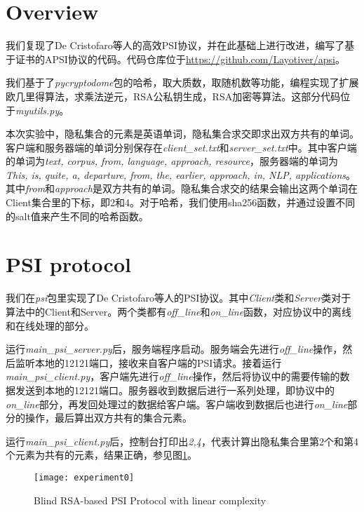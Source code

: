 \section{Overview}
我们复现了De Cristofaro等人的高效PSI协议，并在此基础上进行改进，编写了基于证书的APSI协议的代码。代码仓库位于\href{https://github.com/Layotiver/apsi}
{https://github.com/Layotiver/apsi}。

我们基于了\textit{pycryptodome}包的哈希，取大质数，取随机数等功能，编程实现了扩展欧几里得算法，求乘法逆元，RSA公私钥生成，RSA加密等算法。这部分代码位于\textit{myutils.py}。

本次实验中，隐私集合的元素是英语单词，隐私集合求交即求出双方共有的单词。客户端和服务器端的单词分别保存在\textit{client\_set.txt}和\textit{server\_set.txt}中。其中客户端的单词为\textit{text, corpus, from, language, approach, resource}，服务器端的单词为\textit{This, is, quite, a, departure, from, the, earlier, approach, in, NLP, applications}。其中\textit{from}和\textit{approach}是双方共有的单词。隐私集合求交的结果会输出这两个单词在Client集合里的下标，即2和4。对于哈希，我们使用sha256函数，并通过设置不同的salt值来产生不同的哈希函数。

\section{PSI protocol}
我们在\textit{psi}包里实现了De Cristofaro等人的PSI协议。其中\textit{Client}类和\textit{Server}类对于算法中的Client和Server。两个类都有\textit{off\_line}和\textit{on\_line}函数，对应协议中的离线和在线处理的部分。

运行\textit{main\_psi\_server.py}后，服务端程序启动。服务端会先进行\textit{off\_line}操作，然后监听本地的12121端口，接收来自客户端的PSI请求。接着运行\textit{main\_psi\_client.py}，客户端先进行\textit{off\_line}操作，然后将协议中的需要传输的数据发送到本地的12121端口。服务器收到数据后进行一系列处理，即协议中的\textit{on\_line}部分，再发回处理过的数据给客户端。客户端收到数据后也进行\textit{on\_line}部分的操作，最后算出双方共有的集合元素。

运行\textit{main\_psi\_client.py}后，控制台打印出\textit{2,4}，代表计算出隐私集合里第2个和第4个元素为共有的元素，结果正确，参见图\ref{fig:experiment0}。

\begin{figure}[t]
    \centering
    \texttt{[image: experiment0]}
    \caption{Blind RSA-based PSI Protocol with linear complexity}
    \label{fig:experiment0}
\end{figure}

